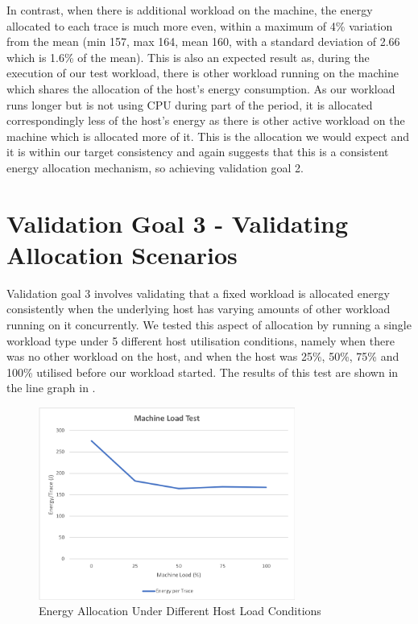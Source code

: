 In contrast, when there is additional workload on the machine, the energy allocated to each trace is much more even, within a maximum of 4\% variation from the mean (min 157, max 164, mean 160, with a standard deviation of 2.66 which is 1.6\% of the mean).  This is also an expected result as, during the execution of our test workload, there is other workload running on the machine which shares the allocation of the host's energy consumption.  As our workload runs longer but is not using CPU during part of the period, it is allocated correspondingly less of the host's energy as there is other active workload on the machine which is allocated more of it.  This is the allocation we would expect and it is within our target consistency and again suggests that this is a consistent energy allocation mechanism, so achieving validation goal 2.

\section{Validation Goal 3 - Validating Allocation Scenarios}
\label{section:validatingallocation}

Validation goal 3 involves validating that a fixed workload is allocated energy consistently when the underlying host has varying amounts of other workload running on it concurrently.  We tested this aspect of allocation by running a single workload type under 5 different host utilisation conditions, namely when there was no other workload on the host, and when the host was 25\%, 50\%, 75\% and 100\% utilised before our workload started.  The results of this test are shown in the line graph in .

\begin{figure}
\centering
\includegraphics[width=0.75\textwidth,trim={2 2 2 2},clip]{Figures/validation-machineload}
\caption{Energy Allocation Under Different Host Load Conditions}
\label{figure:validation-machineload}
\end{figure}

